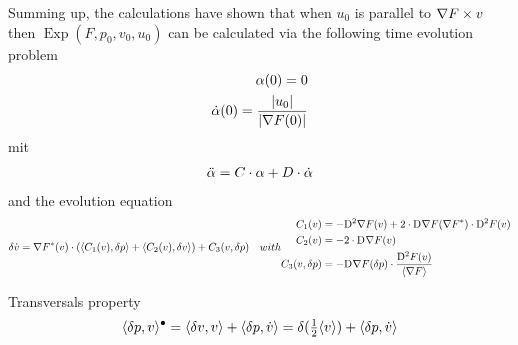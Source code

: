 Summing up, the calculations have shown
that when $ u_0 $ is parallel to $ \nabla F \times v $
then $ \operatorname{Exp}( F, p_0, v_0, u_0 ) $ can be calculated
via the following time evolution problem
\begin{align}
    \alpha( 0 )  =  0  \\
    \dot{ \alpha }( 0 )  =  \frac{ \lvert  u_0  \rvert }{ \lvert  \nabla F( 0 )  \rvert }
\end{align}
mit
\begin{align}
    \ddot{ \alpha }   =
    C \cdot \alpha  +  D \cdot \dot{ \alpha }
\end{align}
and the evolution equation
\begin{subequations}
    \begin{align}
        \delta \dot{ v }   &=
        \darg{F}( v ) \mult
        (   \skap{ C_1( v ) }{ \delta p }  + 
            \skap{ C_2( v ) }{ \delta v }     )  +
        C_3( v, \delta p )
    \end{align}
    with
    \begin{align}
        C_1( v )  &=
        -\diff{2}{\grad{F}}( v )  +
        2 \mult \diff{}{\grad{F}}( \darg{F} ) \mult \diff{2}{F}( v )  \\
        C_2( v )  &=
        -2 \mult \diff{}{\grad{F}}( v )  \\
        C_3( v, \delta p )  &=
        - \diff{}{\grad{F}}( \delta p ) \mult \frac{ \diff{2}{F}(v ) }{ \skaq{ \grad{F} } }
    \end{align}
\end{subequations}



Transversals property
\begin{align}
    \langle  \delta p ,  v  \rangle^\bullet  =
    \langle  \delta v ,  v  \rangle  +  \langle  \delta p ,  \dot{ v }  \rangle  =
    \delta( \tfrac12 \langle  v  \rangle )  +  \langle  \delta p ,  \dot{ v }  \rangle
\end{align}
